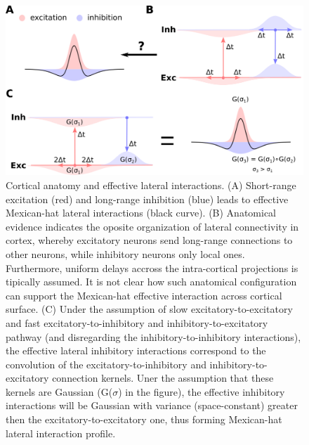\documentclass[utf8]{frontiersSCNS}
\begin{document}
\begin{figure}[htpb!] 
\centering
\includegraphics[width=16cm]{./SVG/FigureLateralInteractions/drawing.png}
\caption{Cortical anatomy and effective lateral interactions. (A) Short-range excitation (red) and long-range inhibition (blue) leads to effective Mexican-hat lateral interactions (black curve). 
(B) Anatomical evidence indicates the oposite organization of lateral connectivity in cortex, whereby excitatory neurons send long-range connections to other neurons, while inhibitory neurons only 
local ones. Furthermore, uniform delays accross the intra-cortical projections is tipically assumed. It is not clear how such anatomical configuration can support the Mexican-hat effective interaction
across cortical surface. (C) Under the assumption of slow excitatory-to-excitatory and fast excitatory-to-inhibitory and inhibitory-to-excitatory pathway (and disregarding the inhibitory-to-inhibitory interactions), 
the effective lateral inhibitory interactions correspond to the convolution of the excitatory-to-inhibitory and inhibitory-to-excitatory connection kernels. Uner the assumption that these kernels are Gaussian (G($\sigma$) in 
the figure), the effective inhibitory interactions will be Gaussian with variance (space-constant) greater then the excitatory-to-excitatory one, thus forming Mexican-hat lateral interaction profile.
}
\label{fig:lat_int}
\end{figure} 
\end{document}
